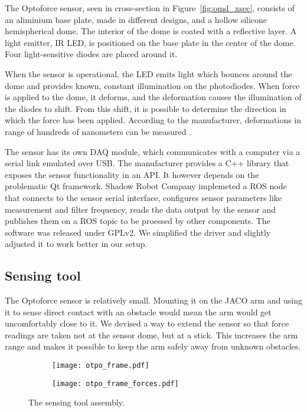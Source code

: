 \documentclass[buriama8_dp.tex]{subfiles}
\begin{document}
The Optoforce sensor, seen in cross-section in Figure~\ref{fig:omd_xsec}, consists of an aliminium base plate, made in different designs, and a hollow silicone hemispherical dome. The interior of the dome is coated with a reflective layer. A light emitter, IR LED, is positioned on the base plate in the center of the dome. Four light-sensitive diodes are placed around it.

When the sensor is operational, the LED emits light which bounces around the dome and provides known, constant illumination on the photodiodes. When force is applied to the dome, it deforms, and the deformation causes the illumination of the diodes to shift. From this shift, it is possible to determine the direction in which the force has been applied. According to the manufacturer, deformations in range of hundreds of nanometers can be measured \cite{opto_whitep}.

The sensor has its own DAQ module, which communicates with a computer via a serial link emulated over USB. The manufacturer provides a C++ library that exposes the sensor functionality in an API. It however depends on the problematic Qt framework. Shadow Robot Company \cite{opto_driver}  implemeted a ROS node that connects to the sensor serial interface, configures sensor parameters like measurement and filter frequency, reads the data output by the sensor and publishes them on a ROS topic to be proessed by other components. The software was released under GPLv2. We simplified the driver and slightly adjusted it to work better in our setup.

\subsection{Sensing tool}
\label{subsec:sense_tool}

The Optoforce sensor is relatively small. Mounting it on the JACO arm and using it to sense direct contact with an obstacle would mean the arm would get uncomfortably close to it. We devised a way to extend the sensor so that force readings are taken not at the sensor dome, but at a stick. This increases the arm range and makes it possible to keep the arm safely away from unknown obstacles.


\begin{figure}[ht]
  \centering

  \begin{subfigure}[t]{0.49\textwidth}
   \label{fig:opto_frame}
   \texttt{[image: otpo\_frame.pdf]}
   \caption{}
  \end{subfigure}
  \begin{subfigure}[t]{0.49\textwidth}
   \label{fig:frame_forces}
   \texttt{[image: otpo\_frame\_forces.pdf]}
   \caption{}
  \end{subfigure}

 \caption[Sensing tool]{The sensing tool assembly.}
 \label{fig:opto_frame}
\end{figure}
\end{document}
